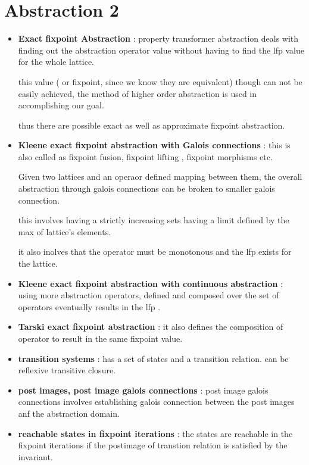 \chapter{Abstraction 2}


\begin{itemize}
	\item{\textbf{Exact fixpoint Abstraction} : property transformer abstraction deals with finding out the abstraction operator value without having to find the lfp value for the whole lattice.

	this value ( or fixpoint, since we know they are equivalent) though can not be easily achieved, the method of higher order abstraction is used in accomplishing our goal.

	thus there are possible exact as well as approximate fixpoint abstraction.
	}

	\item{\textbf{Kleene exact fixpoint abstraction with Galois connections} : this is also called as fixpoint fusion, fixpoint lifting , fixpoint morphisms etc.

	Given two lattices and an operaor defined mapping between them, the overall abstraction through galois connections can be broken to smaller galois connection. 

	this involves having a strictly increasing sets having a limit defined by the max of lattice's elements.

	it also inolves that the operator must be monotonous and the lfp exists for the lattice.
	}

	\item{\textbf{Kleene exact fixpoint abstraction with continuous abstraction} : using more abstraction operators, defined and composed over the set of operators eventually results in the lfp .
	}

	\item{\textbf{Tarski exact fixpoint abstraction} : it also defines the composition of operator to result in the same fixpoint value.
	}

	\item{\textbf{transition systems} : 
	has a set of states and a transition relation. can be reflexive transitive closure.
	}

	\item{\textbf{post images, post image galois connections} : post image galois connections involves establishing galois connection between the post images anf the abstraction domain.
	}

	\item{\textbf{reachable states in fixpoint iterations} : the states are reachable in the fixpoint iterations if the postimage of transtion relation is satisfied by the invariant.
	}

\end{itemize}